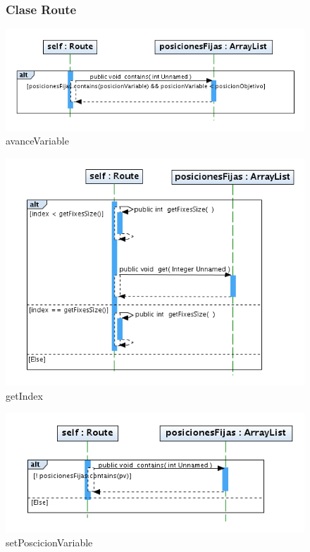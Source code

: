 \begin{figure}
\subsubsection{Clase Route}
\centering
\includegraphics[width=1\textwidth]{imgsSecuencia/Route/avanceVariable.png}
\caption{avanceVariable}
\end{figure}
\newpage
\begin{figure}
\centering
\includegraphics[width=1\textwidth]{imgsSecuencia/Route/getIndex.png}
\caption{getIndex}
\end{figure}
\newpage
\begin{figure}
\centering
\includegraphics[width=1\textwidth]{imgsSecuencia/Route/setPoscicionVariable.png}
\caption{setPoscicionVariable}
\end{figure}
\newpage

